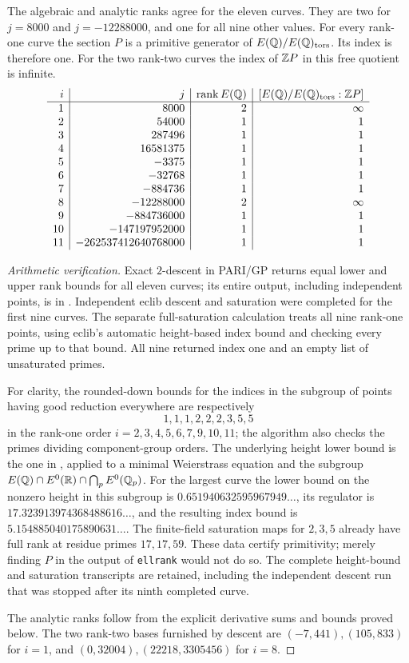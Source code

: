 \begin{statement}
The algebraic and analytic ranks agree for the eleven curves. They are
two for $j=8000$ and $j=-12288000$, and one for all nine other values.
For every rank-one curve the section $P$ is a primitive generator of
$E(\mathbb Q)/E(\mathbb Q)_{\rm tors}$. Its index is therefore one. For the two
rank-two curves the index of $\mathbb Z P$ in this free quotient is infinite.
\[
\begin{array}{r|r|r|r}
i&j&\operatorname{rank}E(\mathbb Q)&[E(\mathbb Q)/E(\mathbb Q)_{\rm tors}:\mathbb Z P]\\\hline
1&8000&2&\infty\\
2&54000&1&1\\
3&287496&1&1\\
4&16581375&1&1\\
5&-3375&1&1\\
6&-32768&1&1\\
7&-884736&1&1\\
8&-12288000&2&\infty\\
9&-884736000&1&1\\
10&-147197952000&1&1\\
11&-262537412640768000&1&1
\end{array}
\]
\end{statement}
\begin{proof}[Arithmetic verification]
Exact $2$-descent in PARI/GP returns equal lower and upper rank bounds
for all eleven curves; its entire output, including independent points,
is in . Independent eclib descent
and saturation were completed for the first nine curves. The separate
full-saturation calculation  treats
all nine rank-one points, using eclib's automatic height-based index
bound and checking every prime up to that bound. All nine returned
index one and an empty list of unsaturated primes.

For clarity, the rounded-down bounds for the indices in the subgroup
of points having good reduction everywhere are respectively
\[
 1,1,1,2,2,2,3,5,5
\]
in the rank-one order $i=2,3,4,5,6,7,9,10,11$; the algorithm also
checks the primes dividing component-group orders. The underlying
height lower bound is the one in
\citet[Theorem 1]{CrCremonaSiksek2006}, applied to a minimal
Weierstrass equation and the subgroup
$E(\mathbb Q)\cap E^0(\mathbb R)\cap\bigcap_pE^0(\mathbb Q_p)$.
For the largest curve the lower bound on the nonzero height in this
subgroup is $0.651940632595967949\ldots$, its regulator is
$17.323913974368488616\ldots$, and the resulting index bound is
$5.154885040175890631\ldots$. The finite-field saturation maps for
$2,3,5$ already have full rank at residue primes $17,17,59$.
These data certify primitivity; merely finding $P$ in the output of
\texttt{ellrank} would not do so. The complete height-bound and
saturation transcripts are retained, including the independent
descent run that was stopped after its ninth completed curve.

The analytic ranks follow from the explicit derivative sums and bounds
proved below. The two rank-two bases furnished by descent are
$(-7,441),(105,833)$ for $i=1$, and
$(0,32004),(22218,3305456)$ for $i=8$.
\end{proof}

